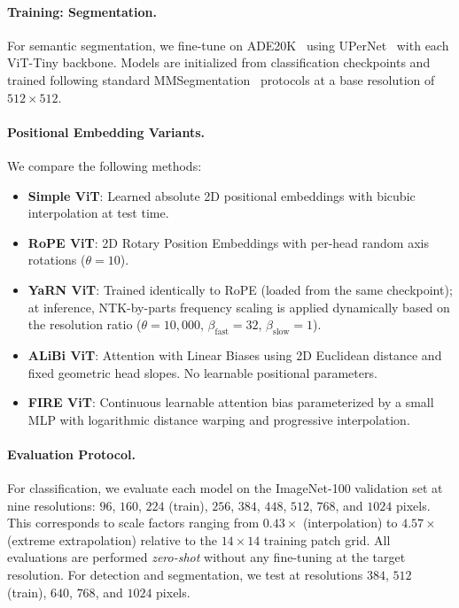 \paragraph{Training: Segmentation.}
For semantic segmentation, we fine-tune on ADE20K~\cite{zhou2017scene} using UPerNet~\cite{xiao2018unified} with each ViT-Tiny backbone. Models
are initialized from classification checkpoints and trained following standard MMSegmentation~\cite{mmseg2020}
protocols at a base resolution of $512 \times 512$.

\paragraph{Positional Embedding Variants.}
We compare the following methods:
\begin{itemize}
    \item \textbf{Simple ViT}: Learned absolute 2D positional embeddings with bicubic interpolation at test time.
    \item \textbf{RoPE ViT}: 2D Rotary Position Embeddings with per-head random axis rotations ($\theta = 10$).
    \item \textbf{YaRN ViT}: Trained identically to RoPE (loaded from the same checkpoint); at inference, NTK-by-parts frequency scaling is applied dynamically based on the resolution ratio ($\theta = 10{,}000$, $\beta_{\text{fast}} = 32$, $\beta_{\text{slow}} = 1$).
    \item \textbf{ALiBi ViT}: Attention with Linear Biases using 2D Euclidean distance and fixed geometric head slopes. No learnable positional parameters.
    \item \textbf{FIRE ViT}: Continuous learnable attention bias parameterized by a small MLP with logarithmic distance warping and progressive interpolation.
\end{itemize}

\paragraph{Evaluation Protocol.}
For classification, we evaluate each model on the ImageNet-100 validation set at nine resolutions:
$96$, $160$, $224$ (train), $256$, $384$, $448$, $512$, $768$, and $1024$ pixels. This corresponds
to scale factors ranging from $0.43\times$ (interpolation) to $4.57\times$ (extreme extrapolation)
relative to the $14 \times 14$ training patch grid. All evaluations are performed \emph{zero-shot}
without any fine-tuning at the target resolution. For detection and segmentation, we test at
resolutions $384$, $512$ (train), $640$, $768$, and $1024$ pixels.

